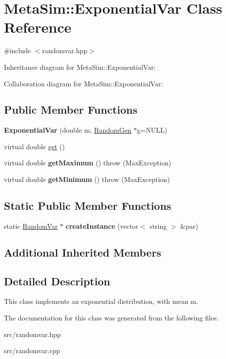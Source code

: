 \hypertarget{classMetaSim_1_1ExponentialVar}{}\section{Meta\+Sim\+:\+:Exponential\+Var Class Reference}
\label{classMetaSim_1_1ExponentialVar}


{\ttfamily \#include $<$randomvar.\+hpp$>$}



Inheritance diagram for Meta\+Sim\+:\+:Exponential\+Var\+:


Collaboration diagram for Meta\+Sim\+:\+:Exponential\+Var\+:
\subsection*{Public Member Functions}
\begin{DoxyCompactItemize}
\item 
{\bfseries Exponential\+Var} (double m, \hyperlink{classMetaSim_1_1RandomGen}{Random\+Gen} $\ast$g=N\+U\+LL)
\item 
virtual double \hyperlink{group__metasim__random_ga84b931546a4cffde57bb958ac9f442d6}{get} ()
\item 
virtual double {\bfseries get\+Maximum} ()  throw (\+Max\+Exception)
\item 
virtual double {\bfseries get\+Minimum} ()  throw (\+Max\+Exception)
\end{DoxyCompactItemize}
\subsection*{Static Public Member Functions}
\begin{DoxyCompactItemize}
\item 
static \hyperlink{classMetaSim_1_1RandomVar}{Random\+Var} $\ast$ {\bfseries create\+Instance} (vector$<$ string $>$ \&par)
\end{DoxyCompactItemize}
\subsection*{Additional Inherited Members}


\subsection{Detailed Description}
This class implements an exponential distribution, with mean m. 

The documentation for this class was generated from the following files\+:\begin{DoxyCompactItemize}
\item 
src/randomvar.\+hpp\item 
src/randomvar.\+cpp\end{DoxyCompactItemize}
